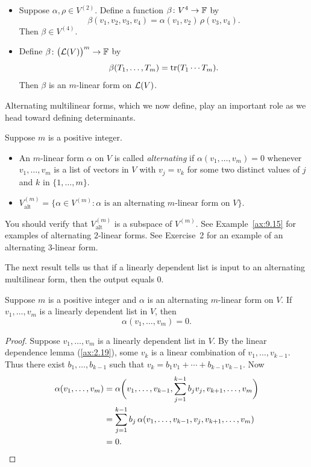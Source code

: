 \begin{example}\label{ax:9.26}\leavevmode
\begin{itemize}
\item Suppose $\alpha,\rho\in V^{(2)}$. Define a function
  $\beta\colon V^4\to\mathbb{F}$ by
  \[ \beta(v_1,v_2,v_3,v_4) = \alpha(v_1,v_2)\,\rho(v_3,v_4). \]
  Then $\beta\in V^{(4)}$.
\item Define $\beta\colon\bigl(\mathcal{L}(V)\bigr)^m\to\mathbb{F}$ by
  \[ \beta(T_1,\dots,T_m) = \operatorname{tr}(T_1\cdots T_m). \]
  Then $\beta$ is an $m$-linear form on $\mathcal{L}(V)$.
\end{itemize}
\end{example}

Alternating multilinear forms, which we now define, play an important role as
we head toward defining determinants.

\begin{definition}\label{ax:9.27}
Suppose $m$ is a positive integer.
\begin{itemize}
\item An $m$-linear form $\alpha$ on $V$ is called \emph{alternating} if
  $\alpha(v_1,\dots,v_m)=0$ whenever $v_1,\dots,v_m$ is a list of vectors in
  $V$ with $v_j=v_k$ for some two distinct values of $j$ and $k$ in
  $\{1,\dots,m\}$.
\item $V_{\mathrm{alt}}^{(m)} = \{\alpha\in V^{(m)} : \alpha \text{ is an
  alternating } m\text{-linear form on } V\}$.
\end{itemize}
\end{definition}

You should verify that $V_{\mathrm{alt}}^{(m)}$ is a subspace of $V^{(m)}$.
See Example~\ref{ax:9.15} for examples of alternating $2$-linear forms. See
Exercise~2 for an example of an alternating $3$-linear form.

The next result tells us that if a linearly dependent list is input to an
alternating multilinear form, then the output equals $0$.

\begin{result}\label{ax:9.28}
Suppose $m$ is a positive integer and $\alpha$ is an alternating $m$-linear
form on $V$. If $v_1,\dots,v_m$ is a linearly dependent list in $V$, then
\[ \alpha(v_1,\dots,v_m) = 0. \]
\end{result}

\begin{proof}
Suppose $v_1,\dots,v_m$ is a linearly dependent list in $V$. By the linear
dependence lemma (\ref{ax:2.19}), some $v_k$ is a linear combination of
$v_1,\dots,v_{k-1}$. Thus there exist $b_1,\dots,b_{k-1}$ such that
$v_k=b_1v_1+\cdots+b_{k-1}v_{k-1}$. Now
\begin{align*}
\alpha(v_1,\dots,v_m)
  &= \alpha\biggl(v_1,\dots,v_{k-1},\sum_{j=1}^{k-1}b_jv_j,v_{k+1},\dots,v_m\biggr)\\
  &= \sum_{j=1}^{k-1}b_j\,\alpha(v_1,\dots,v_{k-1},v_j,v_{k+1},\dots,v_m)\\
  &= 0. \qedhere
\end{align*}
\end{proof}

